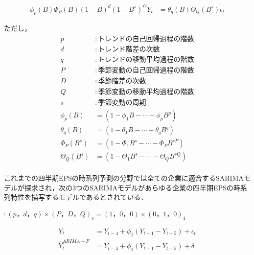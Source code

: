 \documentclass[a4paper，12pt]{jsarticle}
\begin{document}
\begin{equation}
  \begin{split}
    \phi_p(B)\Phi_{P}(B)(1-B)^d(1-B^s)^DY_t &= \theta_q(B)\Theta_Q(B^s)\epsilon_t
  \end{split}
\end{equation}

ただし，
\begin{equation}
  \begin{split}
    p &: トレンドの自己回帰過程の階数 \\
    d &: トレンド階差の次数 \\
    q &: トレンドの移動平均過程の階数 \\
    P &: 季節変動の自己回帰過程の階数 \\
    D &: 季節階差の次数 \\
    Q &: 季節変動の移動平均過程の階数 \\
    s &: 季節変動の周期 \\
    \phi_p(B) &= (1 - \phi_1B - \cdots - \phi_pB^p) \\
    \theta_q(B) &= (1 - \theta_1B - \cdots - \theta_qB^q) \\
    \Phi_P(B^s) &= (1 - \Phi_1B^s - \cdots - \Phi_PB^{sP}) \\
    \Theta_Q(B^s) &= (1 - \Theta_1B^s - \cdots - \Theta_QB^{sQ}) \\
  \end{split}
\end{equation}

これまでの四半期EPSの時系列予測の分野では全ての企業に適合するSARIMAモデルが探求され，次の3つのSARIMAモデル\citep*{foster1977quarterly, griffin1977time, brown1979univariate}があらゆる企業の四半期EPSの時系列特性を描写するモデルであるとされている．

\cite{foster1977quarterly} $: (p，d，q) \times (P，D，Q)_s = (1，0，0) \times (0，1，0)_4$

\begin{equation}
  \begin{split}
    Y_t &= Y_{t-4} + \phi_1(Y_{t-1} - Y_{t-5}) + \epsilon_t \\
    \hat{Y}_t^{ARIMA-F} &= Y_{t-4} + \phi_1(Y_{t-1} - Y_{t-5}) + \delta \\
  \end{split}
\end{equation}
\end{document}
